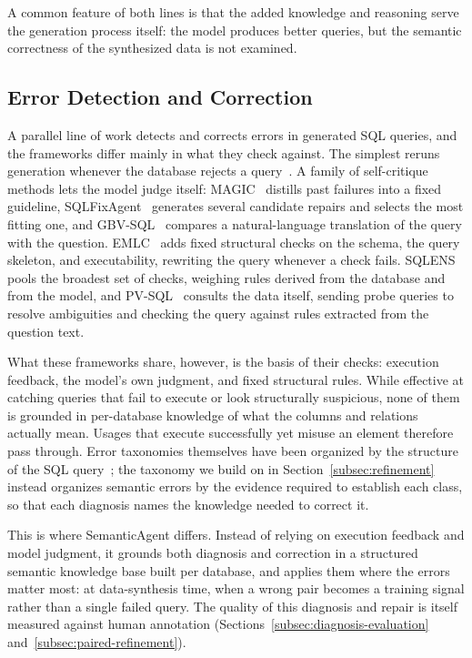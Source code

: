 \documentclass[letterpaper,journal]{IEEEtran}
\begin{document}
A common feature of both lines is that the added knowledge and reasoning serve the generation process itself: the model produces better queries, but the semantic correctness of the synthesized data is not examined.

\subsection{Error Detection and Correction}
\label{subsec:error-correction}

A parallel line of work detects and corrects errors in generated SQL queries, and the frameworks differ mainly in what they check against. The simplest reruns generation whenever the database rejects a query~\cite{wang2025macsql}. A family of self-critique methods lets the model judge itself: MAGIC~\cite{askari2025magic} distills past failures into a fixed guideline, SQLFixAgent~\cite{cen2025sqlfixagent} generates several candidate repairs and selects the most fitting one, and GBV-SQL~\cite{chen2026gbvsql} compares a natural-language translation of the query with the question. EMLC~\cite{lei2026emlc} adds fixed structural checks on the schema, the query skeleton, and executability, rewriting the query whenever a check fails. SQLENS~\cite{gong2025sqlens} pools the broadest set of checks, weighing rules derived from the database and from the model, and PV-SQL~\cite{tian2026pvsql} consults the data itself, sending probe queries to resolve ambiguities and checking the query against rules extracted from the question text.

What these frameworks share, however, is the basis of their checks: execution feedback, the model's own judgment, and fixed structural rules. While effective at catching queries that fail to execute or look structurally suspicious, none of them is grounded in per-database knowledge of what the columns and relations actually mean. Usages that execute successfully yet misuse an element therefore pass through. Error taxonomies themselves have been organized by the structure of the SQL query~\cite{liu2025nl2sqlbugs}; the taxonomy we build on in Section~\ref{subsec:refinement} instead organizes semantic errors by the evidence required to establish each class, so that each diagnosis names the knowledge needed to correct it.

This is where SemanticAgent differs. Instead of relying on execution feedback and model judgment, it grounds both diagnosis and correction in a structured semantic knowledge base built per database, and applies them where the errors matter most: at data-synthesis time, when a wrong pair becomes a training signal rather than a single failed query. The quality of this diagnosis and repair is itself measured against human annotation (Sections~\ref{subsec:diagnosis-evaluation} and~\ref{subsec:paired-refinement}).
\end{document}
